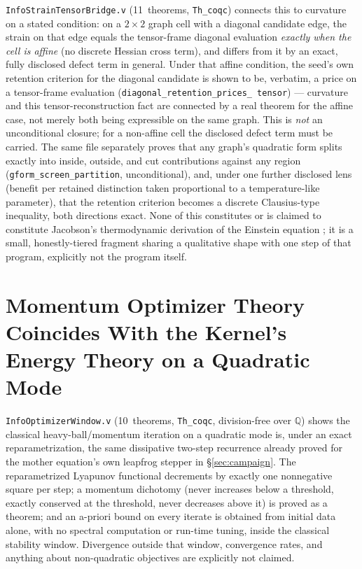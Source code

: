 \documentclass[10pt,twocolumn]{article}
\begin{document}
\texttt{InfoStrainTensorBridge.v} (11~theorems, \texttt{Th\_coqc}) connects
this to curvature on a stated condition: on a $2{\times}2$ graph cell with a
diagonal candidate edge, the strain on that edge equals the tensor-frame
diagonal evaluation \emph{exactly when the cell is affine} (no discrete
Hessian cross term), and differs from it by an exact, fully disclosed
defect term in general. Under that affine condition, the seed's own
retention criterion for the diagonal candidate is shown to be, verbatim, a
price on a tensor-frame evaluation (\texttt{diagonal\_retention\_prices\_
tensor}) --- curvature and this tensor-reconstruction fact are connected by
a real theorem for the affine case, not merely both being expressible on
the same graph. This is \emph{not} an unconditional closure; for a
non-affine cell the disclosed defect term must be carried. The same file
separately proves that any graph's quadratic form splits exactly into
inside, outside, and cut contributions against any region
(\texttt{gform\_screen\_partition}, unconditional), and, under one further
disclosed lens (benefit per retained distinction taken proportional to a
temperature-like parameter), that the retention criterion becomes a
discrete Clausius-type inequality, both directions exact. None of this
constitutes or is claimed to constitute Jacobson's thermodynamic
derivation of the Einstein equation \cite{jacobson1995}; it is a small,
honestly-tiered fragment sharing a qualitative shape with one step of that
program, explicitly not the program itself.

\section{Momentum Optimizer Theory Coincides With the Kernel's Energy Theory on a Quadratic Mode}
\label{sec:optimizer}
\texttt{InfoOptimizerWindow.v} (10~theorems, \texttt{Th\_coqc}, division-free
over $\mathbb{Q}$) shows the classical heavy-ball/momentum iteration on a
quadratic mode is, under an exact reparametrization, the same dissipative
two-step recurrence already proved for the mother equation's own leapfrog
stepper in \S\ref{sec:campaign}. The reparametrized Lyapunov functional
decrements by exactly one nonnegative square per step; a momentum
dichotomy (never increases below a threshold, exactly conserved at the
threshold, never decreases above it) is proved as a theorem; and an
a-priori bound on every iterate is obtained from initial data alone, with
no spectral computation or run-time tuning, inside the classical stability
window. Divergence outside that window, convergence rates, and anything
about non-quadratic objectives are explicitly not claimed.
\end{document}
